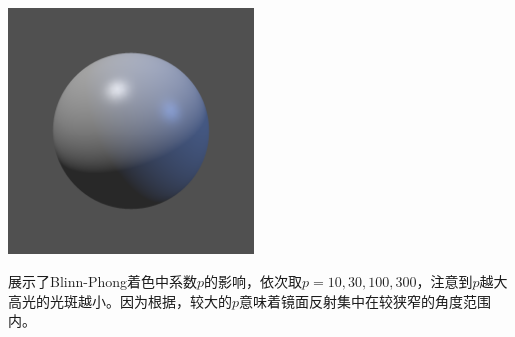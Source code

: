 \begin{Figure}
    \includegraphics[width=6.5cm]{image/RasterizationIOW/SphereBlinnPhong.png}
\end{Figure}

展示了Blinn-Phong着色中系数$p$的影响，依次取$p=10,30,100,300$，注意到$p$越大高光的光斑越小。因为根据，较大的$p$意味着镜面反射集中在较狭窄的角度范围内。

